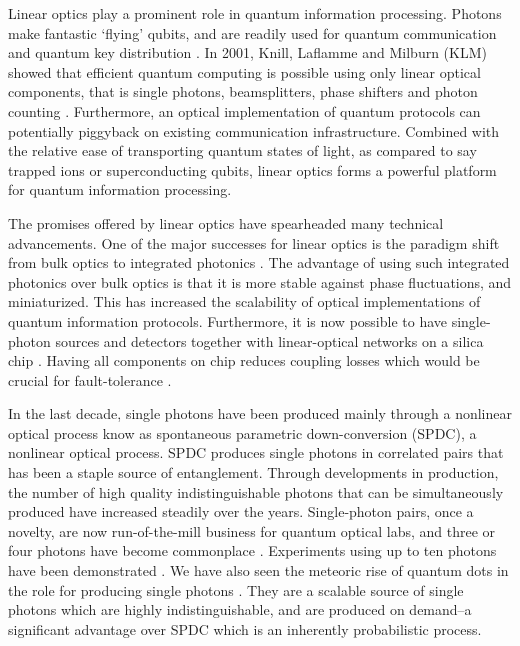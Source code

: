 \documentclass[times,final]{elsarticle}
\begin{document}
Linear optics play a prominent role in quantum information processing. Photons make fantastic `flying' qubits, and are readily used for quantum communication \cite{bib:Northup14} and quantum key distribution \cite{bib:Lo14}. In 2001, Knill, Laflamme and Milburn (KLM) showed that efficient quantum computing is possible using only linear optical components, that is single photons, beamsplitters, phase shifters and photon counting \cite{bib:KLM01}. Furthermore, an optical implementation of quantum protocols can potentially piggyback on existing communication infrastructure. Combined with the relative ease of transporting quantum states of light, as compared to say trapped ions or superconducting qubits, linear optics forms a powerful platform for quantum information processing.

The promises offered by linear optics have spearheaded many technical advancements. One of the major successes for linear optics is the paradigm shift from bulk optics to integrated photonics \cite{bib:Meany15}. The advantage of using such integrated photonics over bulk optics is that it is more stable against phase fluctuations, and miniaturized. This has increased the scalability of optical implementations of quantum information protocols. Furthermore, it is now possible to have single-photon sources and detectors together with linear-optical networks on a silica chip \cite{bib:Sprengers11, bib:Silverstone14}. Having all components on chip reduces coupling losses which would be crucial for fault-tolerance \cite{bib:Li15}.

In the last decade, single photons have been produced mainly through a nonlinear optical process know as spontaneous parametric down-conversion (SPDC), a nonlinear optical process. SPDC produces single photons in correlated pairs that has been a staple source of entanglement. Through developments in production, the number of high quality indistinguishable photons that can be simultaneously produced have increased steadily over the years. Single-photon pairs, once a novelty, are now run-of-the-mill business for quantum optical labs, and three or four photons have become commonplace \cite{bib:Spagnolo12, bib:Tillmann13, bib:Spring13,bib:Broome13}. Experiments using up to ten photons have been demonstrated \cite{bib:WangChen16, bib:Chen17}. We have also seen the meteoric rise of quantum dots in the role for producing single photons \cite{bib:Ding16,bib:WangHe16, bib:213601}. They are a scalable source of single photons which are highly indistinguishable, and are produced on demand--a significant advantage over SPDC which is an inherently probabilistic process.
\end{document}
